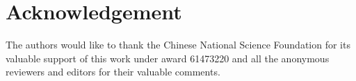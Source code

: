 \documentclass[preprint, 12pt]{elsarticle}
\begin{document}






\section*{Acknowledgement}
The authors would like to thank the Chinese National Science Foundation for its valuable support of this work under award 61473220 and all the anonymous reviewers and editors for their valuable comments.



\end{document}
